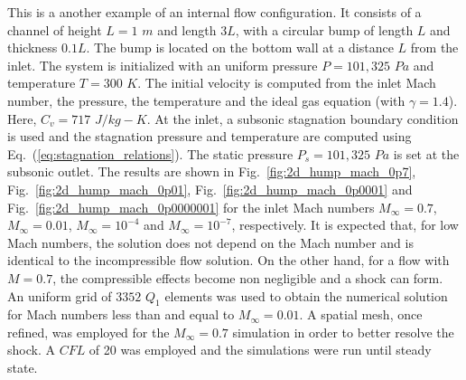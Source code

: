 \documentclass[preprint,10pt]{elsarticle}
\newcommand{\eqt}[1]{Eq.~(\ref{#1})}                     %
\newcommand{\fig}[1]{Fig.~\ref{#1}}                      %
\begin{document}
This is a another example of an internal flow configuration. It consists of a channel of height $L=1$ $m$ 
and length $3L$, with a circular bump of length $L$ and thickness $0.1L$. The bump is located on the bottom 
wall at a distance $L$ from the inlet. The system is initialized with an uniform pressure $P=101,325$ $Pa$ 
and temperature $T=300$ $K$. The initial velocity is computed from the inlet Mach number, the pressure, the 
temperature and the ideal gas equation (with  $\gamma=1.4$). Here,  $C_v = 717$ $J/kg-K$. At the inlet, a 
subsonic stagnation boundary condition is used and the stagnation pressure and temperature are computed 
using \eqt{eq:stagnation_relations}.
The static pressure $P_s = 101,325$ $Pa$ is set at the subsonic outlet. The results are shown in \fig{fig:2d_hump_mach_0p7}, 
\fig{fig:2d_hump_mach_0p01}, \fig{fig:2d_hump_mach_0p0001} and \fig{fig:2d_hump_mach_0p0000001} for the inlet 
Mach numbers $M_{\infty}=0.7$, $M_{\infty}=0.01$, $M_{\infty}=10^{-4}$ and $M_{\infty}=10^{-7}$, respectively. 
It is expected that, for low Mach numbers, the solution does not depend on the Mach number and is 
identical to the incompressible flow solution. On the other hand, for a flow with $M=0.7$, 
the compressible effects become non negligible and a shock can form. An uniform grid of $3352$ $Q_1$ elements 
was used to obtain the numerical solution for Mach numbers less than and equal to $M_{\infty}=0.01$. A spatial mesh, once refined, was 
employed for the $M_{\infty}=0.7$ simulation in order to better resolve the shock. A $CFL$ of 20 was employed 
and the simulations were run until steady state.
%
\end{document}
